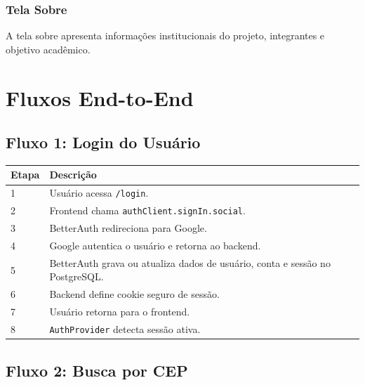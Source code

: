 \documentclass[
    12pt,
    oneside,
    openright,
    a4paper,
    english,
    brazil
]{abntex2}
\begin{document}
\subsection{Tela Sobre}

A tela sobre apresenta informações institucionais do projeto, integrantes e objetivo acadêmico.


\chapter{Fluxos End-to-End}

\section{Fluxo 1: Login do Usuário}

\begin{longtable}{|p{2cm}|p{12cm}|}
\hline
\textbf{Etapa} & \textbf{Descrição} \\
\hline
1 & Usuário acessa \texttt{/login}. \\
\hline
2 & Frontend chama \texttt{authClient.signIn.social}. \\
\hline
3 & BetterAuth redireciona para Google. \\
\hline
4 & Google autentica o usuário e retorna ao backend. \\
\hline
5 & BetterAuth grava ou atualiza dados de usuário, conta e sessão no PostgreSQL. \\
\hline
6 & Backend define cookie seguro de sessão. \\
\hline
7 & Usuário retorna para o frontend. \\
\hline
8 & \texttt{AuthProvider} detecta sessão ativa. \\
\hline
\end{longtable}

\section{Fluxo 2: Busca por CEP}
\end{document}
